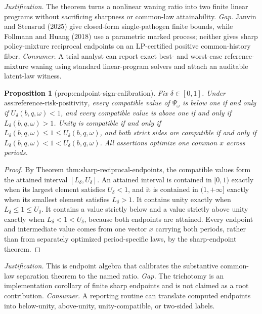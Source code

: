 \documentclass{article}
\newtheorem{proposition}{Proposition}
\begin{document}
\par\smallskip\noindent \textit{Justification.} The theorem turns a nonlinear waning ratio into two finite linear programs without sacrificing sharpness or common-law attainability. \textit{Gap.} Janvin and Stensrud (2025) give closed-form single-pathogen finite bounds, while Follmann and Huang (2018) use a parametric marked process; neither gives sharp policy-mixture reciprocal endpoints on an LP-certified positive common-history fiber. \textit{Consumer.} A trial analyst can report exact best- and worst-case reference-mixture waning using standard linear-program solvers and attach an auditable latent-law witness.

\begin{proposition}[prop:endpoint-sign-calibration]\label{prop:endpoint-sign-calibration}
Fix \(\delta\in[0,1]\). Under \(\text{ass:reference-risk-positivity}\), every compatible value of \(\Psi_\omega\) is below one if and only if \(U_\delta(b,q,\omega)<1\), and every compatible value is above one if and only if \(L_\delta(b,q,\omega)>1\). Unity is compatible if and only if \(L_\delta(b,q,\omega)\leq1\leq U_\delta(b,q,\omega)\), and both strict sides are compatible if and only if \(L_\delta(b,q,\omega)<1<U_\delta(b,q,\omega)\). All assertions optimize one common \(x\) across periods.
\end{proposition}
\begin{proof}
By Theorem \(\text{thm:sharp-reciprocal-endpoints}\), the compatible values form the attained interval \([L_\delta,U_\delta]\).  An attained interval is contained in \([0,1)\) exactly when its largest element satisfies \(U_\delta<1\), and it is contained in \((1,+\infty]\) exactly when its smallest element satisfies \(L_\delta>1\).  It contains unity exactly when \(L_\delta\leq1\leq U_\delta\).  It contains a value strictly below and a value strictly above unity exactly when \(L_\delta<1<U_\delta\), because both endpoints are attained.  Every endpoint and intermediate value comes from one vector \(x\) carrying both periods, rather than from separately optimized period-specific laws, by the sharp-endpoint theorem.
\end{proof}
\par\smallskip\noindent \textit{Justification.} This is endpoint algebra that calibrates the substantive common-law separation theorem to the named ratio. \textit{Gap.} The trichotomy is an implementation corollary of finite sharp endpoints and is not claimed as a root contribution. \textit{Consumer.} A reporting routine can translate computed endpoints into below-unity, above-unity, unity-compatible, or two-sided labels.
\end{document}
